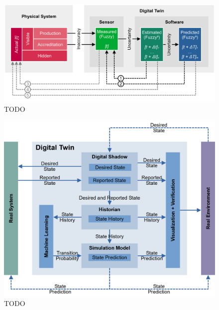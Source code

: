 \documentclass[9pt,conference]{IEEEtran}
\begin{document}
    \begin{figure}[htbp]
        \includegraphics[width=\columnwidth]{Digital Twin Deviation.png}
        \caption{TODO}
        \label{todo-2}
    \end{figure}

    \begin{figure}[htbp]
        \includegraphics[width=\columnwidth]{Digital Twin.png}
        \caption{TODO}
        \label{todo-1}
    \end{figure}
\end{document}
